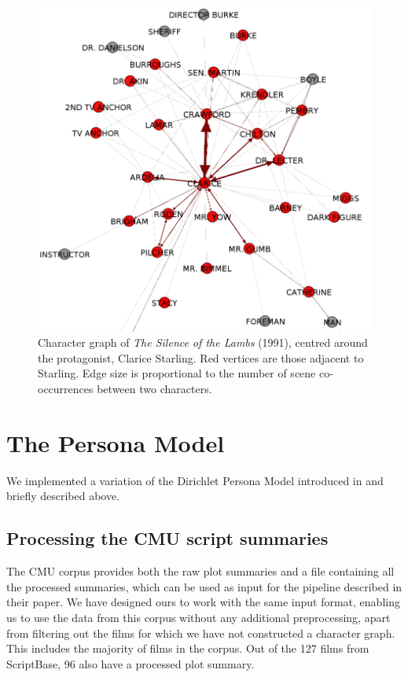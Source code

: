 \documentclass[bsc,frontabs,singlespacing,parskip]{infthesis} %
\begin{document}
\begin{figure}
	\centering
	\includegraphics[scale=0.4]{figures/clarice_graph}
	\caption{Character graph of \textit{The Silence of the Lambs} (1991), centred around the protagonist, Clarice Starling. Red vertices are those adjacent to Starling. Edge size is proportional to the number of scene co-occurrences between two characters.}
\end{figure}

\section{The Persona Model}
\label{sec:persona_impl}
We implemented a variation of the Dirichlet Persona Model introduced in \cite{Bamman2013} and briefly described above.

\subsection{Processing the CMU script summaries}
The CMU corpus provides both the raw plot summaries and a file containing all the processed summaries, which can be used as input for the pipeline described in their paper. We have designed ours to work with the same input format, enabling us to use the data from this corpus without any additional preprocessing, apart from filtering out the films for which we have not constructed a character graph. This includes the majority of films in the corpus. Out of the 127 films from ScriptBase, 96 also have a processed plot summary.
\end{document}
